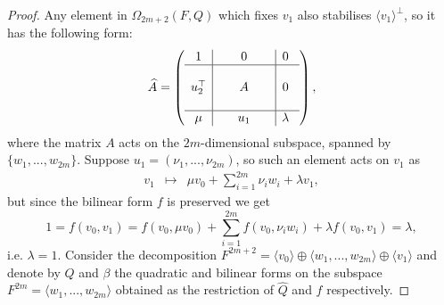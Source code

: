 \begin{proof}
	Any element in $\Omega_{2m+2}(F,Q)$ which fixes $v_1$ also stabilises
    $\langle v_1 \rangle^{\perp}$, so it has the
    following form:
    \begin{equation*}
	\hat{A}=\left(
	    \begin{array}{c|c|c}
		1 & 0 & 0\  \\ \hline 
		 & & \\
		u_2^\T &\ \ \ \ \ A\ \ \ \ \  & 0\  \\ 
		 & & \\ \hline 
		\mu & u_1 & \lambda\ 
	    \end{array}
	\right),
    \end{equation*}
    where the matrix $A$ acts on the $2m$-dimensional subspace, 
    spanned by $\{w_1, ..., w_{2m}\}$. 
    Suppose $u_1 = (\nu_1, ...,  \nu_{2m})$, so such an element acts on $v_1$ as
    \begin{equation*}
	\begin{array}{rcl}
	    v_1 & \mapsto & \mu v_0 + \sum\limits_{i=1}^{2m} \nu_i w_i + \lambda v_1,
	\end{array}
    \end{equation*}
    but since the bilinear form $f$ is preserved we get
    \begin{equation*}
	1 = f(v_0,v_1) = f(v_0,\mu v_0) + \sum\limits_{i=1}^{2m} f(v_0,\nu_i w_i) + \lambda
	f(v_0,v_1) = \lambda,
    \end{equation*}
    i.e. $\lambda = 1$. Consider the decomposition $F^{2m+2} = \langle v_0 \rangle \oplus
    \langle w_1, ..., w_{2m} \rangle \oplus \langle v_1 \rangle$ and denote by $Q$ and
    $\beta$ the quadratic and bilinear forms
    on the subspace $F^{2m} = \langle w_1,...,w_{2m} \rangle$ obtained as the restriction of 
    $\hat{Q}$ and $f$ respectively.
    

\end{proof}
